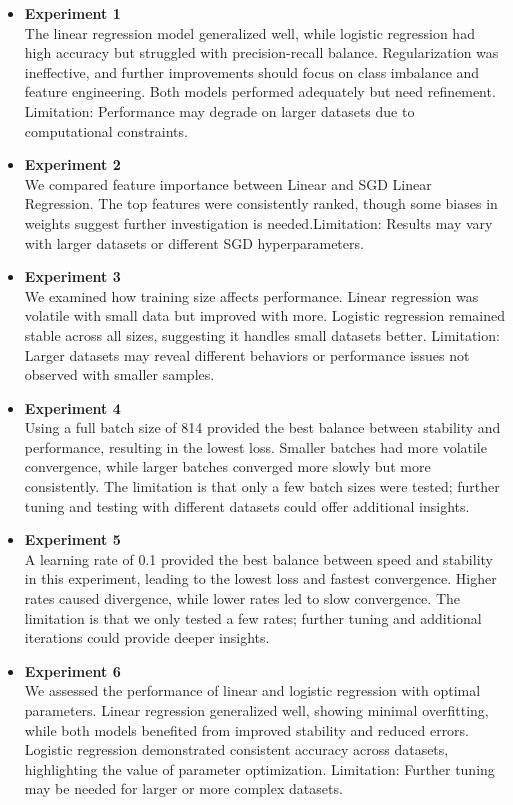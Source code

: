 \documentclass{article}
\begin{document}
\begin{itemize}
    \item \textbf{Experiment 1} \\
    The linear regression model generalized well, while logistic regression had high accuracy but struggled with precision-recall balance. Regularization was ineffective, and further improvements should focus on class imbalance and feature engineering. Both models performed adequately but need refinement. Limitation: Performance may degrade on larger datasets due to computational constraints.

  \item \textbf{Experiment 2}  \\
    We compared feature importance between Linear and SGD Linear Regression. The top features were consistently ranked, though some biases in weights suggest further investigation is needed.Limitation: Results may vary with larger datasets or different SGD hyperparameters.

  \item \textbf{Experiment 3} \\
    We examined how training size affects performance. Linear regression was volatile with small data but improved with more. Logistic regression remained stable across all sizes, suggesting it handles small datasets better. Limitation: Larger datasets may reveal different behaviors or performance issues not observed with smaller samples.

  \item \textbf{Experiment 4} \\
    Using a full batch size of 814 provided the best balance between stability and performance, resulting in the lowest loss. Smaller batches had more volatile convergence, while larger batches converged more slowly but more consistently. The limitation is that only a few batch sizes were tested; further tuning and testing with different datasets could offer additional insights.

  \item \textbf{Experiment 5} \\
  A learning rate of 0.1 provided the best balance between speed and stability in this experiment, leading to the lowest loss and fastest convergence. Higher rates caused divergence, while lower rates led to slow convergence. The limitation is that we only tested a few rates; further tuning and additional iterations could provide deeper insights.

  \item \textbf{Experiment 6}  \\
    We assessed the performance of linear and logistic regression with optimal parameters. Linear regression generalized well, showing minimal overfitting, while both models benefited from improved stability and reduced errors. Logistic regression demonstrated consistent accuracy across datasets, highlighting the value of parameter optimization. Limitation: Further tuning may be needed for larger or more complex datasets.



\end{itemize}
\end{document}
